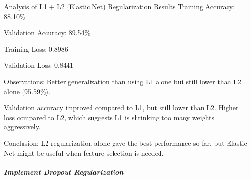 \documentclass[11pt]{article}
\begin{document}
    Analysis of L1 + L2 (Elastic Net) Regularization Results Training
Accuracy: 88.10\%

Validation Accuracy: 89.54\%

Training Loss: 0.8986

Validation Loss: 0.8441

Observations: Better generalization than using L1 alone but still lower
than L2 alone (95.59\%).

Validation accuracy improved compared to L1, but still lower than L2.
Higher loss compared to L2, which suggests L1 is shrinking too many
weights aggressively.

Conclusion: L2 regularization alone gave the best performance so far,
but Elastic Net might be useful when feature selection is needed.

    \subparagraph{Implement Dropout
Regularization}\label{implement-dropout-regularization}
\end{document}
